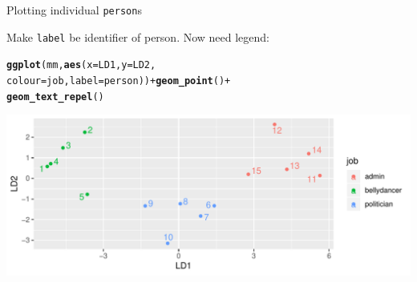 \documentclass[unknownkeysallowed]{beamer}\usepackage[]{graphicx}\usepackage[]{color}
\makeatletter
\def\maxwidth{ %
  \ifdim\Gin@nat@width>\linewidth
    \linewidth
  \else
    \Gin@nat@width
  \fi
}
\newcommand{\hlopt}[1]{\textcolor[rgb]{0,0,0}{#1}}%
\newcommand{\hlstd}[1]{\textcolor[rgb]{0.345,0.345,0.345}{#1}}%
\newcommand{\hlkwc}[1]{\textcolor[rgb]{0.333,0.667,0.333}{#1}}%
\newcommand{\hlkwd}[1]{\textcolor[rgb]{0.737,0.353,0.396}{\textbf{#1}}}%
\newenvironment{kframe}{%
 \def\at@end@of@kframe{}%
 \ifinner\ifhmode%
  \def\at@end@of@kframe{\end{minipage}}%
  \begin{minipage}{\columnwidth}%
 \fi\fi%
 \def\FrameCommand##1{\hskip\@totalleftmargin \hskip-\fboxsep
 \colorbox{shadecolor}{##1}\hskip-\fboxsep
     \hskip-\linewidth \hskip-\@totalleftmargin \hskip\columnwidth}%
 \MakeFramed {\advance\hsize-\width
   \@totalleftmargin\z@ \linewidth\hsize
   \@setminipage}}%
 {\par\unskip\endMakeFramed%
 \at@end@of@kframe}
\newenvironment{knitrout}{}{} %
\makeatother
\begin{document}
\begin{frame}[fragile]{Plotting individual \texttt{person}s}
  
Make \texttt{label} be identifier of person. Now need legend:

\begin{knitrout}
\color{fgcolor}\begin{kframe}
\begin{alltt}
\hlkwd{ggplot}\hlstd{(mm,}\hlkwd{aes}\hlstd{(}\hlkwc{x}\hlstd{=LD1,}\hlkwc{y}\hlstd{=LD2,}
    \hlkwc{colour}\hlstd{=job,}\hlkwc{label}\hlstd{=person))}\hlopt{+}\hlkwd{geom_point}\hlstd{()}\hlopt{+}
    \hlkwd{geom_text_repel}\hlstd{()}
\end{alltt}
\end{kframe}
\includegraphics[width=\maxwidth]{figure/unnamed-chunk-296-1} 

\end{knitrout}
  
  
\end{frame}
\end{document}
